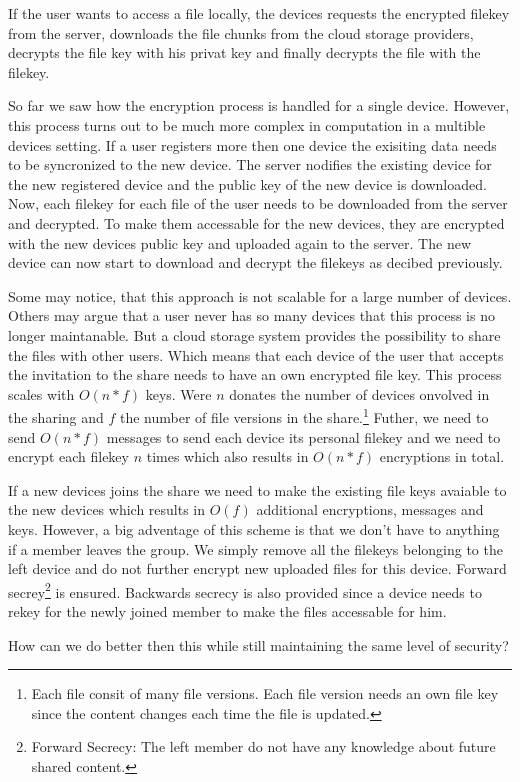 If the user wants to access a file locally, the devices requests the encrypted filekey from the server, downloads the file chunks from the cloud storage providers, decrypts the file key with his privat key and finally decrypts the file with the filekey. 

So far we saw how the encryption process is handled for a single device. However, this process turns out to be much more complex in computation in a multible devices setting.  If a user registers more then one device the exisiting data needs to be syncronized to the new device. The server nodifies the existing device for the new registered device and the public key of the new device is downloaded. Now, each filekey for each file of the user needs to be downloaded from the server and decrypted. To make them accessable for the new devices, they are encrypted with the new devices public key and uploaded again to the server. The new device can now start to download and decrypt the filekeys as decibed previously. 

Some may notice, that this approach is not scalable for a large number of devices. Others may argue that a user never has so many devices that this process is no longer maintanable. But a cloud storage system provides the possibility to share the files with other users. Which means that each device of the user that accepts the invitation to the share needs to have an own encrypted file key. This process scales with $O(n * f)$ keys. Were $n$ donates the number of devices onvolved in the sharing and $f$ the number of file versions in the share.\footnote{Each file consit of many file versions. Each file version needs an own file key since the content changes each time the file is updated.} Futher, we need to send $O(n * f)$ messages to send each device its personal filekey and we need to encrypt each filekey $n$ times which also results in $O(n * f)$ encryptions in total. 

If a new devices joins the share we need to make the existing file keys avaiable to the new devices which results in $O(f)$ additional encryptions, messages and keys. However, a big adventage of this scheme is that we don't have to anything if a member leaves the group. We simply remove all the filekeys belonging to the left device and do not further encrypt new uploaded files for this device. Forward secrey\footnote{Forward Secrecy: The left member do not have any knowledge about future shared content.} is ensured. Backwards secrecy is also provided since a device needs to rekey for the newly joined member to make the files accessable for him. 

How can we do better then this while still maintaining the same level of security? 